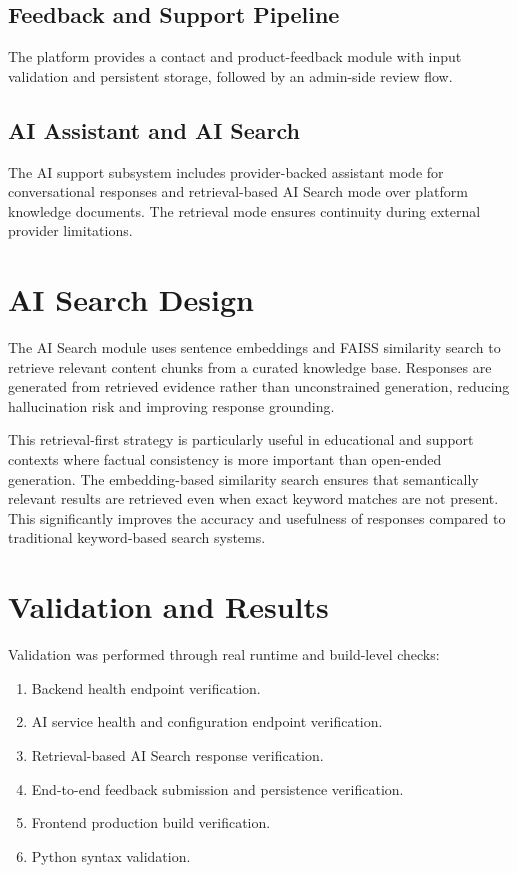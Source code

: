 \documentclass[conference]{IEEEtran}
\begin{document}
\subsection{Feedback and Support Pipeline}
The platform provides a contact and product-feedback module with input validation and persistent storage, followed by an admin-side review flow.

\subsection{AI Assistant and AI Search}
The AI support subsystem includes provider-backed assistant mode for conversational responses and retrieval-based AI Search mode over platform knowledge documents. The retrieval mode ensures continuity during external provider limitations.

\section{AI Search Design}
The AI Search module uses sentence embeddings and FAISS similarity search to retrieve relevant content chunks from a curated knowledge base. Responses are generated from retrieved evidence rather than unconstrained generation, reducing hallucination risk and improving response grounding.

This retrieval-first strategy is particularly useful in educational and support contexts where factual consistency is more important than open-ended generation. The embedding-based similarity search ensures that semantically relevant results are retrieved even when exact keyword matches are not present. This significantly improves the accuracy and usefulness of responses compared to traditional keyword-based search systems.

\section{Validation and Results}
Validation was performed through real runtime and build-level checks:
\begin{enumerate}
\item Backend health endpoint verification.
\item AI service health and configuration endpoint verification.
\item Retrieval-based AI Search response verification.
\item End-to-end feedback submission and persistence verification.
\item Frontend production build verification.
\item Python syntax validation.
\end{enumerate}
\end{document}

